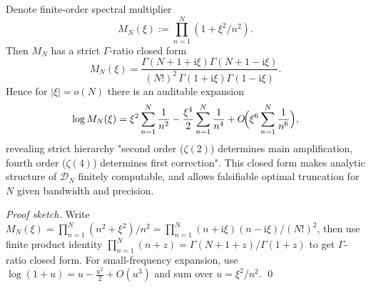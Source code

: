 \begin{conclusion}\label{con:xi-terminal-scale-kernel-gamma-closed-form}
Denote finite-order spectral multiplier
\[
M_N(\xi):=\prod_{n=1}^{N}(1+\xi^2/n^2).
\]
Then \(M_N\) has a strict \(\Gamma\)-ratio closed form
\[
\boxed{\;
M_N(\xi)=\frac{\Gamma(N+1+\mathrm{i}\xi)\Gamma(N+1-\mathrm{i}\xi)}{(N!)^2\,\Gamma(1+\mathrm{i}\xi)\Gamma(1-\mathrm{i}\xi)}.\;}
\]
Hence for \(|\xi|=o(N)\) there is an auditable expansion
\[
\log M_N(\xi)=\xi^2\sum_{n=1}^{N}\frac{1}{n^2}-\frac{\xi^4}{2}\sum_{n=1}^{N}\frac{1}{n^4}+O\!\Bigl(\xi^6\sum_{n=1}^{N}\frac{1}{n^6}\Bigr),
\]
revealing strict hierarchy "second order (\(\zeta(2)\)) determines main amplification, fourth order (\(\zeta(4)\)) determines first correction".
This closed form makes analytic structure of \(\mathcal D_N\) finitely computable, and allows falsifiable optimal truncation for \(N\) given bandwidth and precision.
\end{conclusion}
\begin{proof}[Proof sketch]
Write \(M_N(\xi)=\prod_{n=1}^{N}(n^2+\xi^2)/n^2=\prod_{n=1}^{N}(n+\mathrm{i}\xi)(n-\mathrm{i}\xi)/(N!)^2\), then use finite product identity
\(
\prod_{n=1}^{N}(n+z)=\Gamma(N+1+z)/\Gamma(1+z)
\)
to get \(\Gamma\)-ratio closed form.
For small-frequency expansion, use \(\log(1+u)=u-\frac{u^2}{2}+O(u^3)\) and sum over \(u=\xi^2/n^2\). \qed
\end{proof}

